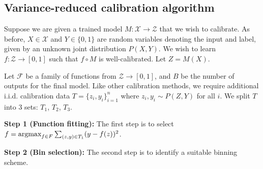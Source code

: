 
\subsection{Variance-reduced calibration algorithm}

Suppose we are given a trained model $M: \mathcal{X} \to \mathcal{Z}$ that we wish to calibrate. As before, $X \in \mathcal{X}$ and $Y \in \{0, 1\}$ are random variables denoting the input and label, given by an unknown joint distribution $P(X, Y)$. We wish to learn $f : \mathcal{Z} \to [0, 1]$ such that $f \circ M$ is well-calibrated. Let $Z = M(X)$.

Let $\mathcal{F}$ be a family of functions from $\mathcal{Z} \to [0, 1]$, and $B$ be the number of outputs for the final model. Like other calibration methods, we require additional i.i.d. calibration data $T = \{ z_i, y_i \}_{i=1}^n$ where $z_i, y_i \sim P(Z, Y)$ for all $i$. We split $T$ into 3 sets: $T_1$, $T_2$, $T_3$.

\textbf{Step 1 (Function fitting):} The first step is to select $f = \mathop{\mbox{argmax}}_{f \in F} \sum_{(z, y) \in T_1} (y - f(z))^2$.

\textbf{Step 2 (Bin selection):} The second step is to identify a suitable binning scheme. 

